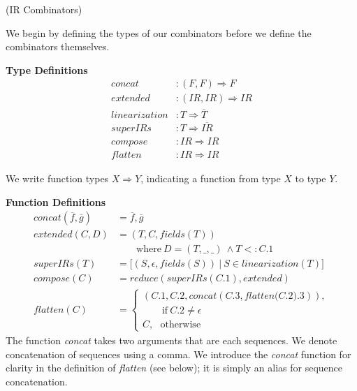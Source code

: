 \documentclass[preprint,10pt]{sigplanconf}
\theoremstyle{definition}
\begin{document}
\begin{defn}{(IR Combinators)}

We begin by defining the types of our combinators before we define the
combinators themselves.

\vspace{0.2cm}
{\bf Type Definitions}
{\small
\begin{align*}
\textit{concat}&        : (F, F) \Rightarrow F\\
\textit{extended}&      : (IR, IR) \Rightarrow IR\\
\textit{linearization}& : T \Rightarrow \overline{T}\\
\textit{superIRs}&      : T \Rightarrow \overline{IR}\\
\textit{compose}&       : IR \Rightarrow IR\\
\textit{flatten}&       : IR \Rightarrow IR
\end{align*}
}%

We write function types $X \Rightarrow Y$, indicating a function from type $X$
to type $Y$.

\vspace{0.2cm}
{\bf Function Definitions}
{\small
\begin{align*}
\textit{concat}(\overline{f}, \overline{g})& = \overline{f}, \overline{g}\\
\textit{extended}(C, D)&                     = (T, C, \textit{fields}(T))\\
                       &                       \qquad \mbox{where}~D = (T, \_, \_)~\land T <: C.1\\
\textit{superIRs}(T)&                        = \lbrack(S, \epsilon, \textit{fields}(S))~|~S\in \textit{linearization}(T)\rbrack\\
\textit{compose}(C)&                         = \textit{reduce}(\textit{superIRs}(C.1),\textit{extended})\\
\textit{flatten}(C)&                         =\left\{ \begin{array}{l}
                                                (C.1, C.2, \textit{concat}(C.3, \textit{flatten(C.2).3})),\\
                                                \qquad\mbox{if}~C.2\neq\epsilon\\
                                                C,~~~\mbox{otherwise}
                                              \end{array} \right.
\end{align*}
}%
The function \textit{concat} takes two arguments that are each sequences. We
denote concatenation of sequences using a comma. We introduce the
\textit{concat} function for clarity in the definition of \textit{flatten}
(see below); it is simply an alias for sequence concatenation.


\end{defn}
\end{document}

